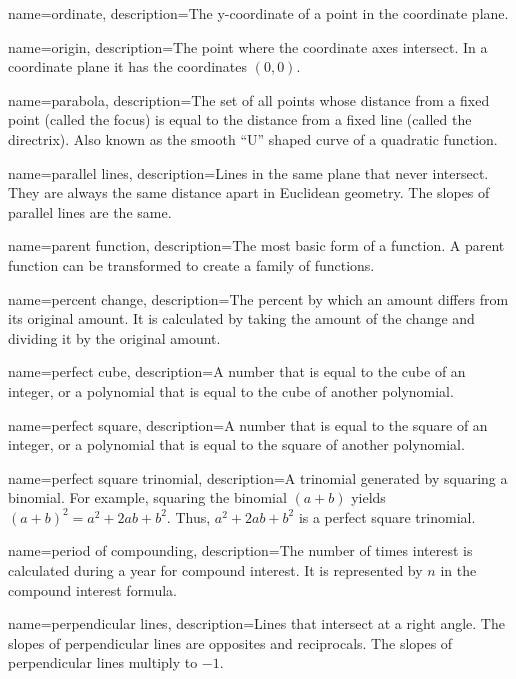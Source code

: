  {
	name=ordinate,
	description={The y-coordinate of a point in the coordinate plane.}
}
  
 {
	name=origin,
	description={The point where the coordinate axes intersect. In a coordinate plane it has the coordinates $(0,0)$.}
}

 {
	name=parabola,
	description={The set of all points whose distance from a fixed point (called the focus) is equal to the distance from a fixed line (called the directrix). Also known as the smooth ``U'' shaped curve of a quadratic function.}
}

 {
	name=parallel lines,
	description={Lines in the same plane that never intersect. They are always the same distance apart in Euclidean geometry. The slopes of parallel lines are the same.}
}

 {
	name=parent function,
	description={The most basic form of a function. A parent function can be transformed to create a family of functions.}
}

 {
	name=percent change,
	description={The percent by which an amount differs from its original amount. It is calculated by taking the amount of the change and dividing it by the original amount.}
}

 {
	name=perfect cube,
	description={A number that is equal to the cube of an integer, or a polynomial that is equal to the cube of another polynomial.}
}

 {
	name=perfect square,
	description={A number that is equal to the square of an integer, or a polynomial that is equal to the square of another polynomial.}
}

 {
	name=perfect square trinomial,
	description={A trinomial generated by squaring a binomial. For example, squaring the binomial $(a+b)$ yields $(a+b)^2 = a^2 + 2ab + b^2$. Thus, $a^2 + 2ab + b^2$ is a perfect square trinomial.}
}

 {
	name=period of compounding,
	description={The number of times interest is calculated during a year for compound interest. It is represented by $n$ in the \gls{compound interest} formula.}
}

 {
	name=perpendicular lines,
	description={Lines that intersect at a right angle. The slopes of perpendicular lines are opposites and reciprocals. The slopes of perpendicular lines multiply to $-1$.}
}

